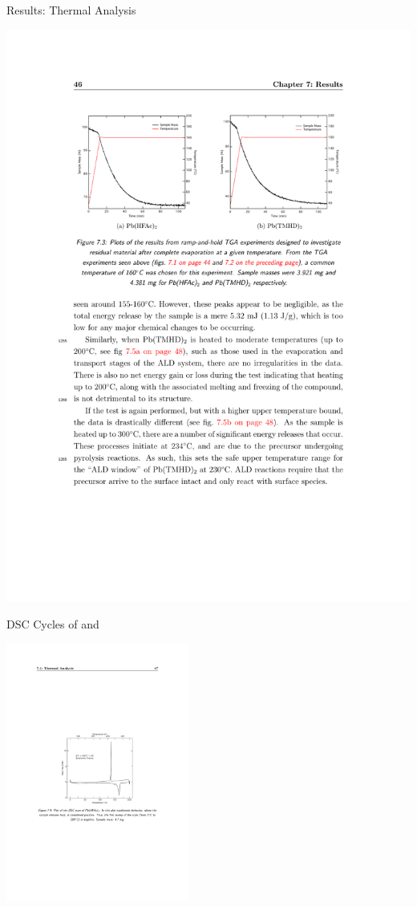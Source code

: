 \documentclass[professionalfont]{beamer}
\begin{document}
\begin{frame}{Results: Thermal Analysis}
\begin{overprint}
\begin{center}
		\centerline{\includegraphics[width=\textwidth]{./graphics/data/tga/hold}}
		\end{center}
		\begin{center}
		DSC Cycles of  and \\
		\vspace{0.5cm}
		\centerline{\includegraphics[width=0.45\textwidth]{./graphics/data/dsc/hfac}%
}
\end{center}
\end{overprint}
\end{frame}
\end{document}
